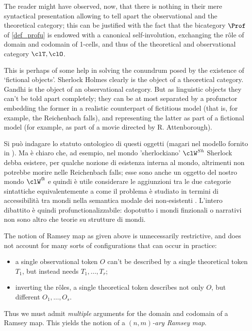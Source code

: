 \begin{remark}
	The reader might have observed, now, that there is nothing in their mere syntactical presentation allowing to tell apart the observational and the theoretical category; this can be justified with the fact that the bicategory $\Prof$ of \autoref{def_profu} is endowed with a canonical self-involution, exchanging the r\^ole of domain and codomain of 1-cells, and thus of the theoretical and observational category $\clT,\clO$.
	
	This is perhaps of some help in solving the conundrum posed by the existence of `fictional objects'. Sherlock Holmes clearly is the object of a theoretical category. Gandhi is the object of an observational category. But as linguistic objects they can't be told apart completely; they can be at most separated by a profunctor embedding the former in a realistic counterpart of fictitious model (that is, for example, the Reichenbach falls), and representing the latter as part of a fictional model (for example, as part of a movie directed by R. Attenborough).

	Si può indagare lo statuto ontologico di questi oggetti (magari nel modello fornito in \cite{catont1}). Ma è chiaro che, ad esempio, nel mondo 'sherlockiano' $\clW^{Sh}$ Sherlock debba esistere, per qualche nozione di esistenza interna al mondo, altrimenti non potrebbe morire nelle Reichenbach falls; esse sono anche un oggetto del nostro mondo $\clW^@$ e quindi è utile considerare le aggiunzioni tra le due categorie sintattiche equivalentemente a come il problema è studiato in termini di accessibilità tra mondi nella semantica modale dei non-esistenti \cite{}. L'intero dibattito è quindi profunctionalizzabile: dopotutto i mondi finzionali o narrativi non sono altro che teorie su strutture di mondi. 
\end{remark}
\begin{remark}\label{multiramsey}
	The notion of Ramsey map as given above is unnecessarily restrictive, and does not account for many sorts of configurations that can occur in practice:
	\begin{itemize}
		\item a single observational token $O$ can't be described by a single theoretical token $T_1$, but instead needs $T_1,\dots,T_r$;
		\item inverting the r\^oles, a single theoretical token describes not only $O$, but different $O_1,\dots,O_s$.
	\end{itemize}
	Thus we must admit \emph{multiple} arguments for the domain and codomain of a Ramsey map. This yields the notion of a \emph{$(n,m)$-ary Ramsey map}.
\end{remark}
